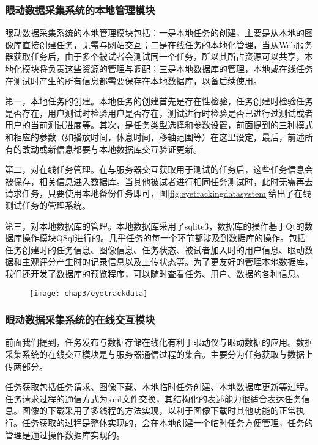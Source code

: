 \subsubsection{眼动数据采集系统的本地管理模块}
\label{sec:local}
眼动数据采集系统的本地管理模块包括：一是本地任务的创建，主要是从本地的图像库直接创建任务，无需与网站交互；二是在线任务的本地化管理，当从Web服务器获取任务后，由于多个被试者会测试同一个任务，所以其所占资源可以共享，本地化模块将负责这些资源的管理与调配；三是本地数据库的管理，本地或在线任务在测试时产生的所有信息都需要保存在本地数据库，以备后续使用。

第一，本地任务的创建。本地任务的创建首先是存在性检验，任务创建时检验任务是否存在，用户测试时检验用户是否存在，测试进行时检验是否已进行过测试或者用户的当前测试进度等。其次，是任务类型选择和参数设置，前面提到的三种模式和相应的参数（如播放时间，休息时间，移轴范围等）在这里设定，最后，前述所有的改动或新信息都要与本地数据库交互验证更新。

第二，对在线任务管理。在与服务器交互获取用于测试的任务后，这些任务信息会被保存，相关信息进入数据库。当其他被试者进行相同任务测试时，此时无需再去请求任务，只要使用本地备份任务即可，图\ref{fig:eyetrackingdatasystem}给出了在线测试任务的管理系统。

第三，对本地数据库的管理。本地数据库采用了sqlite3，数据库的操作基于Qt的数据库操作模块QSql进行的。几乎任务的每一个环节都涉及到数据库的操作。包括任务创建时的任务信息、图像信息、任务状态、被试者加入时的用户信息、眼动数据和主观评分产生时的记录信息以及上传状态等。为了更友好的管理本地数据库，我们还开发了数据库的预览程序，可以随时查看任务、用户、数据的各种信息。
\begin{figure}[!htp]
  \centering
  \texttt{[image: chap3/eyetrackdata]}
\end{figure}
\subsubsection{眼动数据采集系统的在线交互模块}
\label{sec:online}
前面我们提到，任务发布与数据存储在线化有利于眼动仪与眼动数据的应用。数据采集系统的在线交互模块是与服务器通信过程的集合。主要分为任务获取与数据上传两部分。

任务获取包括任务请求、图像下载、本地临时任务创建、本地数据库更新等过程。任务请求过程的通信方式为xml文件交换，其结构化的表述能力很适合表达任务信息。图像的下载采用了多线程的方法实现，以利于图像下载时其他功能的正常执行。任务获取的过程是整体实现的，会在本地创建一个临时任务方便管理，任务的管理是通过操作数据库实现的。

